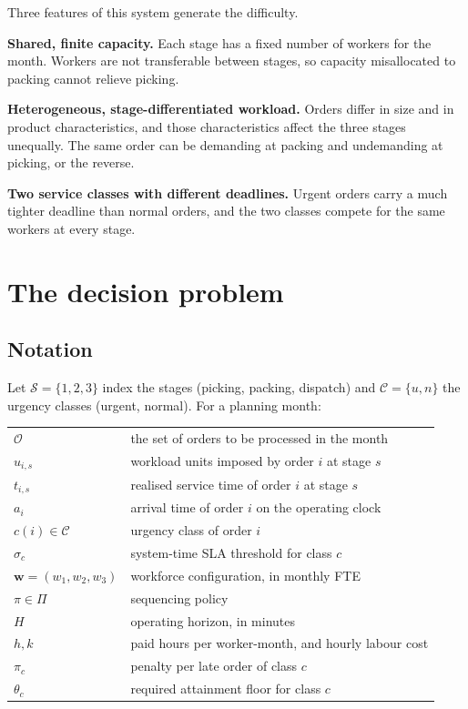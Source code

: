 Three features of this system generate the difficulty.

\textbf{Shared, finite capacity.} Each stage has a fixed number of workers for the month.
Workers are not transferable between stages, so capacity misallocated to packing cannot relieve
picking.

\textbf{Heterogeneous, stage-differentiated workload.} Orders differ in size and in product
characteristics, and those characteristics affect the three stages unequally. The same order
can be demanding at packing and undemanding at picking, or the reverse.

\textbf{Two service classes with different deadlines.} Urgent orders carry a much tighter
deadline than normal orders, and the two classes compete for the same workers at every stage.

\section{The decision problem}
\label{sec:decision-problem}

\subsection{Notation}

Let \(\mathcal{S} = \{1, 2, 3\}\) index the stages (picking, packing, dispatch) and
\(\mathcal{C} = \{u, n\}\) the urgency classes (urgent, normal). For a planning month:

\begin{center}
\begin{tabularx}{0.94\textwidth}{lX}
\toprule
\(\mathcal{O}\) & the set of orders to be processed in the month \\
\(u_{i,s}\) & workload units imposed by order \(i\) at stage \(s\) \\
\(t_{i,s}\) & realised service time of order \(i\) at stage \(s\) \\
\(a_i\) & arrival time of order \(i\) on the operating clock \\
\(c(i) \in \mathcal{C}\) & urgency class of order \(i\) \\
\(\sigma_c\) & system-time SLA threshold for class \(c\) \\
\(\mathbf{w} = (w_1, w_2, w_3)\) & workforce configuration, in monthly FTE \\
\(\pi \in \Pi\) & sequencing policy \\
\(H\) & operating horizon, in minutes \\
\(h, k\) & paid hours per worker-month, and hourly labour cost \\
\(\pi_c\) & penalty per late order of class \(c\) \\
\(\theta_c\) & required attainment floor for class \(c\) \\
\bottomrule
\end{tabularx}
\end{center}

